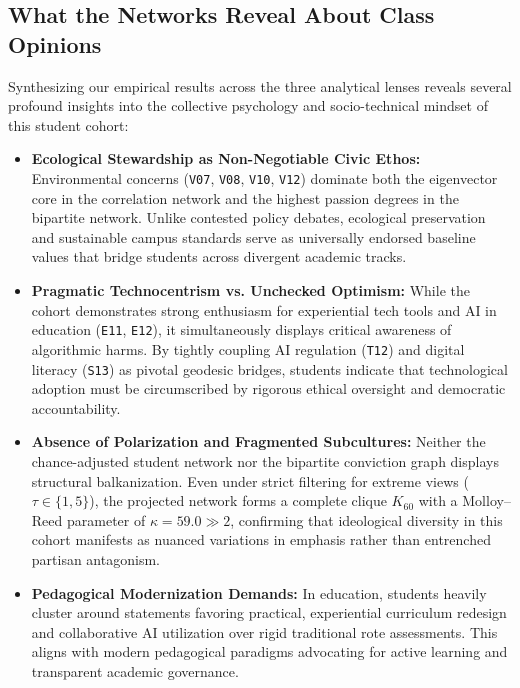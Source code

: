 \documentclass[10pt, a4paper]{article}
\begin{document}
\subsection{What the Networks Reveal About Class Opinions}
Synthesizing our empirical results across the three analytical lenses reveals several profound insights into the collective psychology and socio-technical mindset of this student cohort:
\begin{itemize}
    \setlength{\itemsep}{1pt}
    \item \textbf{Ecological Stewardship as Non-Negotiable Civic Ethos:} Environmental concerns (\texttt{V07}, \texttt{V08}, \texttt{V10}, \texttt{V12}) dominate both the eigenvector core in the correlation network and the highest passion degrees in the bipartite network. Unlike contested policy debates, ecological preservation and sustainable campus standards serve as universally endorsed baseline values that bridge students across divergent academic tracks.
    \item \textbf{Pragmatic Technocentrism vs. Unchecked Optimism:} While the cohort demonstrates strong enthusiasm for experiential tech tools and AI in education (\texttt{E11}, \texttt{E12}), it simultaneously displays critical awareness of algorithmic harms. By tightly coupling AI regulation (\texttt{T12}) and digital literacy (\texttt{S13}) as pivotal geodesic bridges, students indicate that technological adoption must be circumscribed by rigorous ethical oversight and democratic accountability.
    \item \textbf{Absence of Polarization and Fragmented Subcultures:} Neither the chance-adjusted student network nor the bipartite conviction graph displays structural balkanization. Even under strict filtering for extreme views ($\tau \in \{1, 5\}$), the projected network forms a complete clique $K_{60}$ with a Molloy--Reed parameter of $\kappa = 59.0 \gg 2$, confirming that ideological diversity in this cohort manifests as nuanced variations in emphasis rather than entrenched partisan antagonism.
    \item \textbf{Pedagogical Modernization Demands:} In education, students heavily cluster around statements favoring practical, experiential curriculum redesign and collaborative AI utilization over rigid traditional rote assessments. This aligns with modern pedagogical paradigms advocating for active learning and transparent academic governance.
\end{itemize}
\end{document}

